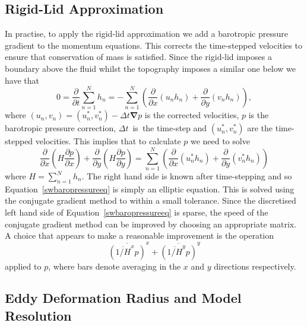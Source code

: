 \documentclass[12pt,a4paper]{report}
\newcommand*\equref[1]{Equation~\eqref{#1}}
\begin{document}
  \subsection{Rigid-Lid Approximation}
  
  In practise, to apply the rigid-lid approximation we add a barotropic pressure
  gradient to the momentum equations. This corrects the time-stepped velocities 
  to ensure that conservation of mass is satisfied. Since the rigid-lid imposes a
  boundary above the fluid whilst the topography imposes a similar one below 
  we have that 
  \begin{equation}
  0=\frac{  \partial}{\partial t} \sum^{N}_{n=1} h_{n} = -
  \sum^{N}_{n=1} \left( \frac{\partial }{\partial x} (u_{n}h_{n} )+ 
  \frac{\partial }{\partial y} (v_{n}h_{n} ) \right) ,
  \end{equation}
  where $\left(u_n,v_n\right)=\left(u_n^{*},v^{*}_n\right)-\Delta t \boldsymbol{\nabla}p$
  is the corrected velocities, $p$ is the barotropic pressure correction,
  $\Delta t$~is~the time-step and
  $\left(u_n^{*},v^{*}_n\right)$ are the time-stepped velocities. This implies that to
  calculate $p$ we need to solve 
  \begin{equation}
  \frac{  \partial}{\partial x} \left( H \frac{  \partial p}{\partial x} \right) +
  \frac{  \partial}{\partial y} \left( H \frac{  \partial p}{\partial y} \right) =
  \sum^{N}_{n=1} \left( \frac{\partial }{\partial x} (u^{*}_{n}h_{n} )+ 
  \frac{\partial }{\partial y} (v^{*}_{n}h_{n} ) \right)
  \label{swbaropressureeq}
  \end{equation}
  where $H= \sum^{N}_{n=1} h_{n}$. The right hand side is known after time-stepping 
  and so \equref{swbaropressureeq} is simply an elliptic equation. This is solved using
  the conjugate gradient method to within a small tolerance. Since
  the discretised left hand side of \equref{swbaropressureeq} is sparse, the speed of the 
  conjugate gradient method can be improved by choosing an appropriate matrix.
  A choice that appears to make a reasonable improvement is the operation
  \begin{equation}
  \overline{\left(\overline{1/H}^{x} p\right) }^{x} + \overline{\left(\overline{1/H}^{y} p\right) }^{y}
  \end{equation}
  applied to $p$, where bars denote averaging in the $x$ and $y$ directions respectively.
  
  
  
  \subsection{Eddy Deformation Radius and Model Resolution}
  
\end{document}
